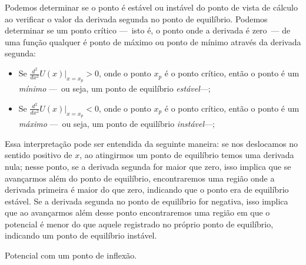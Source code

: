 Podemos determinar se o ponto é estável ou instável do ponto de vista de cálculo ao verificar o valor da derivada segunda no ponto de equilíbrio. Podemos determinar se um ponto crítico ---~isto é, o ponto onde a derivada é zero~--- de uma função qualquer é ponto de máximo ou ponto de mínimo através da derivada segunda:
\begin{itemize}
    \item Se $\frac{d^2}{dx^2}U(x)|_{x = x_p} > 0$, onde o ponto $x_p$ é o ponto crítico, então o ponto é um \emph{mínimo} ---~ou seja, um ponto de equilíbrio \emph{estável}---;
    \item Se $\frac{d^2}{dx^2}U(x)|_{x = x_p} < 0$, onde o ponto $x_p$ é o ponto crítico, então o ponto é um \emph{máximo} ---~ou seja, um ponto de equilíbrio \emph{instável}---;
\end{itemize}
%
Essa interpretação pode ser entendida da seguinte maneira: se nos deslocamos no sentido positivo de $x$, ao atingirmos um ponto de equilíbrio temos uma derivada nula; nesse ponto, se a derivada segunda for maior que zero, isso implica que se avançarmos além do ponto de equilíbrio, encontraremos uma região onde a derivada primeira é maior do que zero, indicando que o ponto era de equilíbrio estável. Se a derivada segunda no ponto de equilíbrio for negativa, isso implica que ao avançarmos além desse ponto encontraremos uma região em que o potencial é menor do que aquele registrado no próprio ponto de equilíbrio, indicando um ponto de equilíbrio instável.

\begin{marginfigure}[-2cm]
\centering
{}
\caption{Potencial com um ponto de inflexão. \label{Fig:PotPontoDeSela}}
\end{marginfigure}

